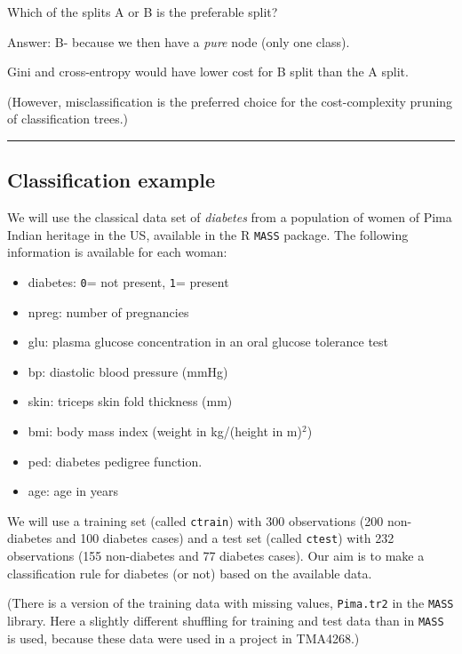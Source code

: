 \documentclass[
  letterpaper,
  DIV=11,
  numbers=noendperiod]{scrartcl}
\providecommand{\tightlist}{%
  \setlength{\itemsep}{0pt}\setlength{\parskip}{0pt}}\usepackage{longtable,booktabs,array}
\begin{document}
Which of the splits A or B is the preferable split?

Answer: B- because we then have a \emph{pure} node (only one class).

Gini and cross-entropy would have lower cost for B split than the A
split.

(However, misclassification is the preferred choice for the
cost-complexity pruning of classification trees.)

\begin{center}\rule{0.5\linewidth}{0.5pt}\end{center}

\hypertarget{classification-example}{%
\subsection{Classification example}\label{classification-example}}

We will use the classical data set of \emph{diabetes} from a population
of women of Pima Indian heritage in the US, available in the R
\texttt{MASS} package. The following information is available for each
woman:

\begin{itemize}
\tightlist
\item
  diabetes: \texttt{0}= not present, \texttt{1}= present
\item
  npreg: number of pregnancies
\item
  glu: plasma glucose concentration in an oral glucose tolerance test
\item
  bp: diastolic blood pressure (mmHg)
\item
  skin: triceps skin fold thickness (mm)
\item
  bmi: body mass index (weight in kg/(height in m)\(^2\))
\item
  ped: diabetes pedigree function.
\item
  age: age in years
\end{itemize}

We will use a training set (called \texttt{ctrain}) with 300
observations (200 non-diabetes and 100 diabetes cases) and a test set
(called \texttt{ctest}) with 232 observations (155 non-diabetes and 77
diabetes cases). Our aim is to make a classification rule for diabetes
(or not) based on the available data.

(There is a version of the training data with missing values,
\texttt{Pima.tr2} in the \texttt{MASS} library. Here a slightly
different shuffling for training and test data than in \texttt{MASS} is
used, because these data were used in a project in TMA4268.)
\end{document}
